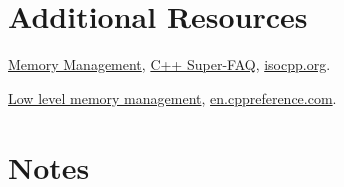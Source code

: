 \documentclass[10pt,landscape,a4paper]{article}
\begin{document}
\begin{multicols*}{3}
\section*{Additional Resources}

\href{https://isocpp.org/wiki/faq/freestore-mgmt}{Memory Management}, \href{https://isocpp.org/faq}{C++ Super-FAQ}, \href{https://isocpp.org}{isocpp.org}.

\href{https://en.cppreference.com/w/cpp/memory/new}{Low level memory management}, \href{https://en.cppreference.com/}{en.cppreference.com}.

\vspace{40ex}

\section*{Notes}

\begin{userendnotes}
  \hgrayrule
  \hgrayrule
  \hgrayrule
  \hgrayrule
  \hgrayrule
  \hgrayrule
  \hgrayrule
  \hgrayrule
  \hgrayrule
  \hgrayrule
  \hgrayrule
  \hgrayrule
  \hgrayrule
  \hgrayrule
  \hgrayrule
  \hgrayrule
  \hgrayrule
  \hgrayrule
  \hgrayrule
  \hgrayrule
  \hgrayrule
  \hgrayrule
  \hgrayrule
  \hgrayrule
\end{userendnotes}

\end{multicols*}
\end{document}
